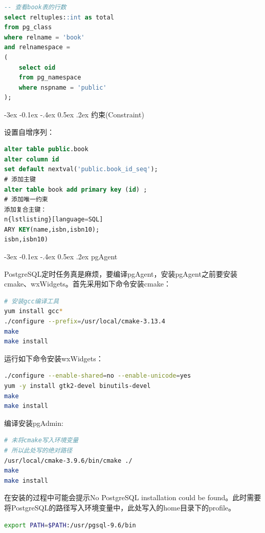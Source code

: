 \documentclass[8pt]{book}
\makeatletter
\numberwithin{dummy}{section}
\theoremstyle{ocrenumbox}
\theoremstyle{blacknumex}
\theoremstyle{blacknumbox}
\theoremstyle{ocrenum}
\renewcommand{\subsection}{\@startsection {subsection}{2}{\z@}
	{-3ex \@plus -0.1ex \@minus -.4ex}
	{0.5ex \@plus.2ex }
	{\normalfont\sffamily\bfseries}}
\newlength\esp
\makeatother
\begin{document}
\begin{lstlisting}[language=SQL]
-- 查看book表的行数
select reltuples::int as total 
from pg_class 
where relname = 'book' 
and relnamespace = 
(
	select oid 
	from pg_namespace 
	where nspname = 'public'
);
\end{lstlisting}

\subsection{约束(Constraint)}

设置自增序列：

\begin{lstlisting}[language=SQL]
alter table public.book 
alter column id 
set default nextval('public.book_id_seq');
# 添加主键
alter table book add primary key (id) ;
# 添加唯一约束
添加复合主键：
n{lstlisting}[language=SQL]
ARY KEY(name,isbn,isbn10);
isbn,isbn10)
\end{lstlisting}

\subsection{pgAgent}

PostgreSQL定时任务真是麻烦，要编译pgAgent，安装pgAgent之前要安装cmake、wxWidgets。首先采用如下命令安装cmake：

\begin{lstlisting}[language=Bash]
# 安装gcc编译工具
yum install gcc*
./configure --prefix=/usr/local/cmake-3.13.4
make
make install
\end{lstlisting}

运行如下命令安装wxWidgets：

\begin{lstlisting}[language=Bash]
./configure --enable-shared=no --enable-unicode=yes
yum -y install gtk2-devel binutils-devel
make
make install
\end{lstlisting}

编译安装pgAdmin:

\begin{lstlisting}[language=Bash]
# 未将cmake写入环境变量
# 所以此处写的绝对路径
/usr/local/cmake-3.9.6/bin/cmake ./
make
make install
\end{lstlisting}

在安装的过程中可能会提示No PostgreSQL installation could be found。此时需要将PostgreSQL的路径写入环境变量中，此处写入的home目录下的profile。

\begin{lstlisting}[language=Bash]
export PATH=$PATH:/usr/pgsql-9.6/bin
\end{lstlisting}
\end{document}
